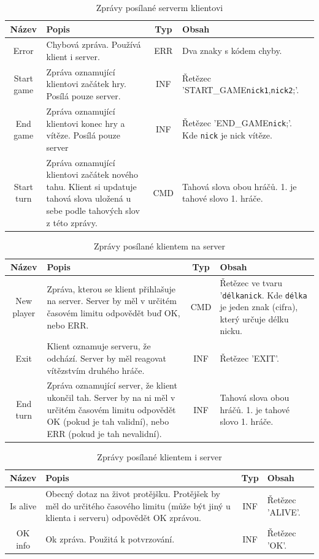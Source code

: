 \documentclass[11pt,a4paper]{scrartcl}
\begin{document}
	\begin{center}
		\begin{longtable} {|c | p{5cm} | c | p{5cm} |}
			\caption{Zprávy posílané serverm klientovi} \\
			\hline
			Název & Popis & Typ & Obsah \\
			\hline
			\hline
			Error & Chybová zpráva. Používá klient i server. & ERR & Dva znaky s kódem chyby.\\
			\hline
			Start game & Zpráva oznamující klientovi začátek hry. Posílá pouze server.& INF & Řetězec 'START\_GAME\verb|nick1|,\verb|nick2|;'.\\
			\hline
			End game & Zpráva oznamující klientovi konec hry a vítěze. Posílá pouze server& INF & Řetězec 'END\_GAME\verb|nick|;'. Kde \verb|nick| je nick vítěze. \\
			\hline
			Start turn & Zpráva oznamující klientovi začátek nového tahu. Klient si updatuje tahová slova uložená u sebe podle tahových slov z této zprávy.& CMD &  Tahová slova obou hráčů. 1. je tahové slovo 1. hráče.\\
			\hline
		\end{longtable}
	
		\begin{longtable} {|c | p{5cm} | c | p{5cm} |}
			\caption{Zprávy posílané klientem na server} \\
			\hline
			Název & Popis & Typ & Obsah \\
			\hline
			\hline
			New player & Zpráva, kterou se klient přihlašuje na server. Server by měl v určitém časovém limitu odpovědět buď OK, nebo ERR. & CMD  & Řetězec ve tvaru '\verb|délka|\verb|nick|. Kde \verb|délka| je jeden znak (cifra), který určuje délku nicku.\\	
			\hline
			Exit & Klient oznamuje serveru, že odchází. Server by měl reagovat vítězstvím druhého hráče. & INF &  Řetězec 'EXIT'.\\
			\hline
			End turn & Zpráva oznamující server, že klient ukončil tah. Server by na ni měl v určitém časovém limitu odpovědět OK (pokud je tah validní), nebo ERR (pokud je tah nevalidní).& INF  & Tahová slova obou hráčů. 1. je tahové slovo 1. hráče.\\
			\hline
		\end{longtable}
	
		\begin{longtable} {|c | p{5cm} | c | p{5cm} |}
			\caption{Zprávy posílané klientem i server} \\
			\hline
			Název & Popis & Typ & Obsah \\
			\hline
			\hline
			Is alive & Obecný dotaz na život protějšku. Protějšek by měl do určitého časového limitu (může být jiný u klienta i serveru) odpovědět OK zprávou.& INF &  Řetězec 'ALIVE'.\\			
			\hline
			OK info & Ok zpráva. Použitá k potvrzování.& INF &  Řetězec 'OK'.\\			
			\hline
		\end{longtable}
	

\end{center}
\end{document}
